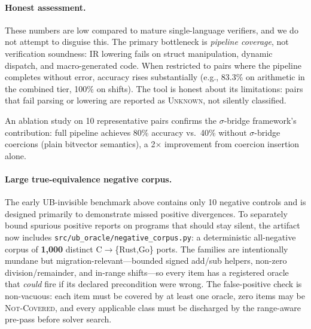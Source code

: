 \documentclass[10pt,a4paper]{article}
\begin{document}
\paragraph{Honest assessment.}
These numbers are low compared to mature single-language verifiers,
and we do not attempt to disguise this.  The primary bottleneck is
\emph{pipeline coverage}, not verification soundness: IR lowering fails on struct
manipulation, dynamic dispatch, and macro-generated code.  When
restricted to pairs where the pipeline completes without error,
accuracy rises substantially (e.g., 83.3\% on arithmetic in the
combined tier, 100\% on shifts).  The tool is honest about its
limitations: pairs that fail parsing or lowering are reported as
\textsc{Unknown}, not silently classified.

An ablation study on 10 representative pairs confirms the
$\sigma$-bridge framework's contribution: full pipeline achieves
80\% accuracy vs.\ 40\% without $\sigma$-bridge coercions (plain
bitvector semantics), a 2$\times$ improvement from coercion
insertion alone.

\paragraph{Large true-equivalence negative corpus.}
The early UB-invisible benchmark above contains only 10 negative controls and is
designed primarily to demonstrate missed positive divergences.  To separately
bound spurious positive reports on programs that should stay silent, the artifact
now includes \texttt{src/ub\_oracle/negative\_corpus.py}: a deterministic
all-negative corpus of \textbf{1{,}000} distinct C$\to$\{Rust,Go\} ports.  The
families are intentionally mundane but migration-relevant---bounded signed
add/sub helpers, non-zero division/remainder, and in-range shifts---so every item
has a registered oracle that \emph{could} fire if its declared precondition were
wrong.  The false-positive check is non-vacuous: each item must be covered by at
least one oracle, zero items may be \textsc{Not-Covered}, and every applicable
class must be discharged by the range-aware pre-pass before solver search.
\end{document}
